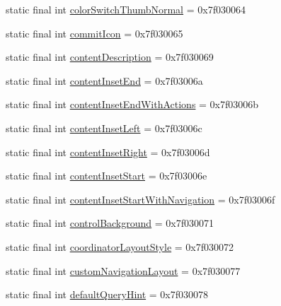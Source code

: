 \begin{DoxyCompactItemize}
\item 
static final int \mbox{\hyperlink{classcom_1_1synnapps_1_1carouselview_1_1_r_1_1attr_a8230012d99f4e52b0df4156d21065f37}{color\+Switch\+Thumb\+Normal}} = 0x7f030064
\item 
static final int \mbox{\hyperlink{classcom_1_1synnapps_1_1carouselview_1_1_r_1_1attr_a984888ce9420389ed9787d31e6d5549e}{commit\+Icon}} = 0x7f030065
\item 
static final int \mbox{\hyperlink{classcom_1_1synnapps_1_1carouselview_1_1_r_1_1attr_a764ae43a06e261c52badb72323cc1bdb}{content\+Description}} = 0x7f030069
\item 
static final int \mbox{\hyperlink{classcom_1_1synnapps_1_1carouselview_1_1_r_1_1attr_aa15b5d74fe0c07e94e196ba244676aab}{content\+Inset\+End}} = 0x7f03006a
\item 
static final int \mbox{\hyperlink{classcom_1_1synnapps_1_1carouselview_1_1_r_1_1attr_a89ba6ac77ab334f9a8dd19d6deb32fd1}{content\+Inset\+End\+With\+Actions}} = 0x7f03006b
\item 
static final int \mbox{\hyperlink{classcom_1_1synnapps_1_1carouselview_1_1_r_1_1attr_a25dde1ac7fb7c73a64fde709f47653a4}{content\+Inset\+Left}} = 0x7f03006c
\item 
static final int \mbox{\hyperlink{classcom_1_1synnapps_1_1carouselview_1_1_r_1_1attr_aa5bf87c5019f23f4032dd97d00481c18}{content\+Inset\+Right}} = 0x7f03006d
\item 
static final int \mbox{\hyperlink{classcom_1_1synnapps_1_1carouselview_1_1_r_1_1attr_ae3871459f909859d37a0c43c6c7ce027}{content\+Inset\+Start}} = 0x7f03006e
\item 
static final int \mbox{\hyperlink{classcom_1_1synnapps_1_1carouselview_1_1_r_1_1attr_a3c2dc4eb76c054e7933026d9eb07da26}{content\+Inset\+Start\+With\+Navigation}} = 0x7f03006f
\item 
static final int \mbox{\hyperlink{classcom_1_1synnapps_1_1carouselview_1_1_r_1_1attr_ab99a23d43535ed7b4f74f2ccbdf5b481}{control\+Background}} = 0x7f030071
\item 
static final int \mbox{\hyperlink{classcom_1_1synnapps_1_1carouselview_1_1_r_1_1attr_ae4fe3a7b547abd11d5cbda0b608a4b09}{coordinator\+Layout\+Style}} = 0x7f030072
\item 
static final int \mbox{\hyperlink{classcom_1_1synnapps_1_1carouselview_1_1_r_1_1attr_a991c9b6c652149bbf753b48aa7e97b28}{custom\+Navigation\+Layout}} = 0x7f030077
\item 
static final int \mbox{\hyperlink{classcom_1_1synnapps_1_1carouselview_1_1_r_1_1attr_aff7893bb0a956b02451a9edcf25306c6}{default\+Query\+Hint}} = 0x7f030078

\end{DoxyCompactItemize}
